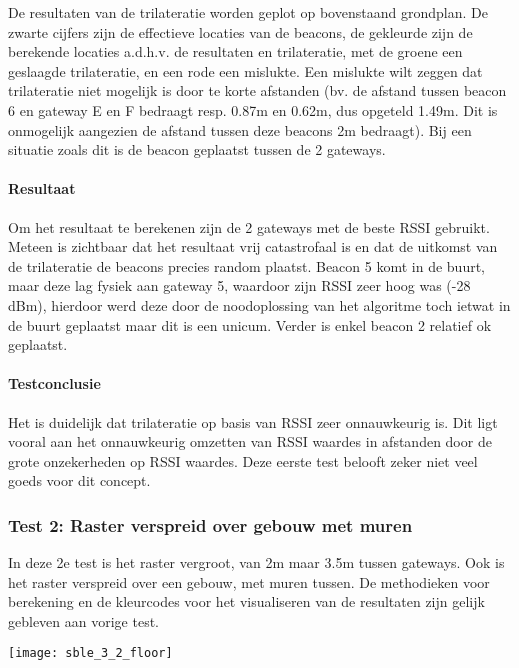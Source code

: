 De resultaten van de trilateratie worden geplot op bovenstaand grondplan. De zwarte cijfers zijn de effectieve locaties van de beacons, de gekleurde zijn de berekende locaties a.d.h.v. de resultaten en trilateratie, met de groene een geslaagde trilateratie, en een rode een mislukte. Een mislukte wilt zeggen dat trilateratie niet mogelijk is door te korte afstanden (bv. de afstand tussen beacon 6 en gateway E en F bedraagt resp. 0.87m en 0.62m, dus opgeteld 1.49m. Dit is onmogelijk aangezien de afstand tussen deze beacons 2m bedraagt). Bij een situatie zoals dit is de beacon geplaatst tussen de 2 gateways.

\paragraph{Resultaat}
Om het resultaat te berekenen zijn de 2 gateways met de beste RSSI gebruikt. Meteen is zichtbaar dat het resultaat vrij catastrofaal is en dat de uitkomst van de trilateratie de beacons precies random plaatst. Beacon 5 komt in de buurt, maar deze lag fysiek aan gateway 5, waardoor zijn RSSI zeer hoog was (-28 dBm), hierdoor werd deze door de noodoplossing van het algoritme toch ietwat in de buurt geplaatst maar dit is een unicum. Verder is enkel beacon 2 relatief ok geplaatst.

\paragraph{Testconclusie}
Het is duidelijk dat trilateratie op basis van RSSI zeer onnauwkeurig is. Dit ligt vooral aan het onnauwkeurig omzetten van RSSI waardes in afstanden door de grote onzekerheden op RSSI waardes. Deze eerste test belooft zeker niet veel goeds voor dit concept.

\subsubsection{Test 2: Raster verspreid over gebouw met muren}
\begin{minipage}{0.55\textwidth}
In deze 2e test is het raster vergroot, van 2m maar 3.5m tussen gateways. Ook is het raster verspreid over een gebouw, met muren tussen.
De methodieken voor berekening en de kleurcodes voor het visualiseren van de resultaten zijn gelijk gebleven aan vorige test.
\end{minipage}
\hfill
\begin{minipage}{0.42\textwidth}
	\texttt{[image: sble\_3\_2\_floor]}
\end{minipage}

